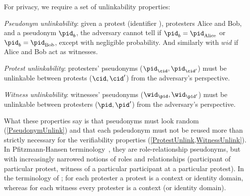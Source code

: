 For privacy, we require a set of unlinkability properties:%
\label{privacy-properties}
\begin{requirements}[P]
\item\label{PseudonymUnlink} \emph{Pseudonym unlinkability}: given a protest 
  (identifier \cid), protesters Alice and Bob, and a pseudonym \(\pid_b\), the 
  adversary cannot tell if \(\pid_b = \pid_{\text{Alice}}\) or \(\pid_b = 
    \pid_{\text{Bob}}\), except with negligible probability. And similarly with $wid$ if Alice and Bob act as witnesses.
\item\label{ProtestUnlink} \emph{Protest unlinkability}: protesters' pseudonyms 
  (\(\pid_{\cid}, \pid_{\cid'}\)) must be unlinkable between protests (\(\cid, 
  \cid'\)) from the adversary's perspective.
\item\label{WitnessUnlink}\emph{Witness unlinkability}:  witnesses' pseudonyms 
  (\(\wid_{\pid}, \wid_{\pid'}\)) must be unlinkable between protesters 
  (\(\pid, \pid'\)) from the adversary's perspective.
\end{requirements}

What these properties say is that pseudonyms must look random 
(\cref{PseudonymUnlink}) and that each psdeudonym must not be reused
more than strictly necessary for the verifiability properties 
(\cref{ProtestUnlink,WitnessUnlink}). In Pfitzmann-Hansen
terminology~\cite{pfitzmann-hansen}, they are role-relationship
pseudonyms, but with increasingly narrowed notions of roles and
relationships (participant of particular protest, witness of a
particular participant at a particular protest).
In the terminology of \textcite{SybilFreePseudonyms}; for each protester a 
protest is a context or identity domain, whereas for each witness every 
protester is a context (or identity domain).
